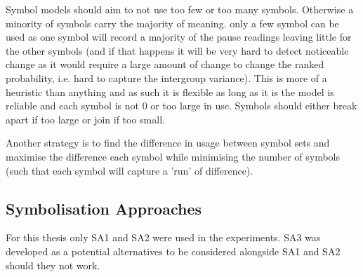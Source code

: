 Symbol models should aim to not use too few or too many symbols. Otherwise a minority of symbols carry the majority of meaning. only a few symbol can be used as one symbol will record a majority of the pause readings leaving little for the other symbols (and if that happens it will be very hard to detect noticeable change as it would require a large amount of change to change the ranked probability, i.e. hard to capture the intergroup variance). This is more of a heuristic than anything and as such it is flexible as long as it is the model is reliable and each symbol is not 0 or too large in use. Symbols should either break apart if too large or join if too small. 

Another strategy is to find the difference in usage between symbol sets and maximise the difference each symbol while minimising the number of symbols (such that each symbol will capture a 'run' of difference).





\subsection{Symbolisation Approaches}
For this thesis only SA1 and SA2 were used in the experiments. SA3 was developed as a potential alternatives to be considered alongside SA1 and SA2 should they not work.